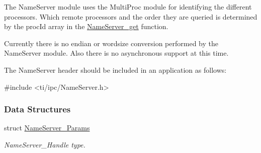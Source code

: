 The NameServer module uses the MultiProc module for identifying the different processors. Which remote processors and the order they are queried is determined by the procId array in the \hyperlink{_name_server_8h_a5f1013e57e7c5da9f003063d70a76e01}{NameServer\_\-get} function.

Currently there is no endian or wordsize conversion performed by the NameServer module. Also there is no asynchronous support at this time.

The NameServer header should be included in an application as follows: 
\begin{DoxyCode}
  #include <ti/ipc/NameServer.h>
\end{DoxyCode}
 \subsubsection*{Data Structures}
\begin{DoxyCompactItemize}
\item 
struct \hyperlink{struct_name_server___params}{NameServer\_\-Params}
\begin{DoxyCompactList}\small\item\em NameServer\_\-Handle type. \item\end{DoxyCompactList}\end{DoxyCompactItemize}
